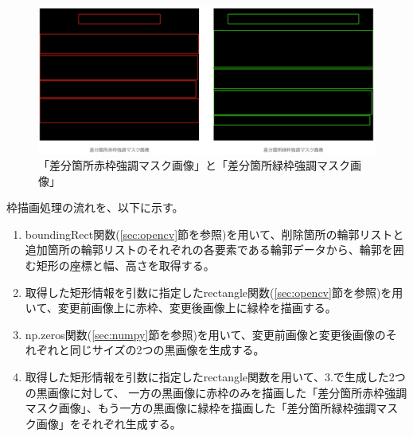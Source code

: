 \begin{figure}[tp]
    \begin{center}
        \includegraphics[width=1.0\columnwidth]{image/4_img_diff_highlight_mask.png}
        \caption{「差分箇所赤枠強調マスク画像」と「差分箇所緑枠強調マスク画像」}
        \label{fig: img_diff_highlight_mask}
    \end{center}
\end{figure}
\par
枠描画処理の流れを、以下に示す。
\begin{enumerate}
    \item boundingRect関数(\ref{sec:opencv}節を参照)を用いて、削除箇所の輪郭リストと追加箇所の輪郭リストのそれぞれの各要素である輪郭データから、輪郭を囲む矩形の座標と幅、高さを取得する。
    \item 取得した矩形情報を引数に指定したrectangle関数(\ref{sec:opencv}節を参照)を用いて、変更前画像上に赤枠、変更後画像上に緑枠を描画する。
    \item np.zeros関数(\ref{sec:numpy}節を参照)を用いて、変更前画像と変更後画像のそれぞれと同じサイズの2つの黒画像を生成する。
    \item 取得した矩形情報を引数に指定したrectangle関数を用いて、3.で生成した2つの黒画像に対して、
          一方の黒画像に赤枠のみを描画した「差分箇所赤枠強調マスク画像」、もう一方の黒画像に緑枠を描画した「差分箇所緑枠強調マスク画像」をそれぞれ生成する。
\end{enumerate}


